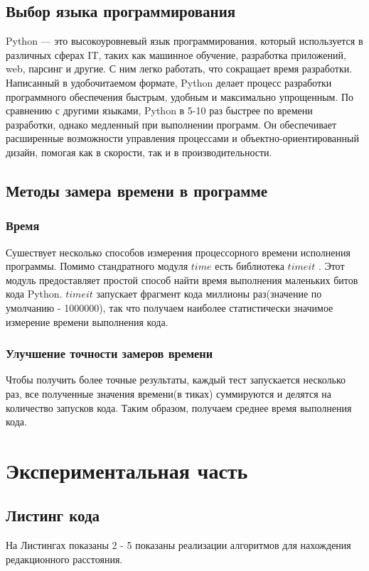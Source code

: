 \documentclass[a4paper]{article}
\begin{document}
	\subsection{Выбор языка программирования}
	Python\cite{what_is_python} — это высокоуровневый язык программирования, который используется в различных сферах IT, таких как машинное обучение, разработка приложений, web, парсинг и другие.
	С ним легко работать, что сокращает время разработки. Написанный в удобочитаемом формате, Python делает процесс разработки программного обеспечения быстрым, удобным и максимально упрощенным.
	По сравнению с другими языками, Python в 5-10 раз быстрее по времени разработки, однако медленный при выполнении программ. Он обеспечивает расширенные возможности управления процессами и объектно-ориентированный дизайн, помогая как в скорости, так и в производительности.
	\clearpage

	\subsection{Методы замера времени в программе}
	\subsubsection{Время}
	Сушествует несколько способов измерения процессорного времени исполнения программы. 
	Помимо стандратного модуля $time$ есть библиотека $timeit$ \cite{timeit}. Этот модуль предоставляет простой способ найти время выполнения маленьких битов кода Python.
	$timeit$ запускает фрагмент кода миллионы раз(значение по умолчанию - 1000000), так что получаем наиболее статистически значимое измерение времени выполнения кода.
	\subsubsection{Улучшение точности замеров времени} Чтобы получить более точные результаты, каждый тест запускается несколько раз, все полученные значения времени(в тиках) суммируются и делятся на количество запусков кода. Таким образом, получаем среднее время выполнения кода.
	\clearpage
	\section{Экспериментальная часть}
	
	\subsection{Листинг кода}
	На Листингах показаны 2 - 5 показаны реализации алгоритмов для нахождения редакционного расстояния.
\end{document}
